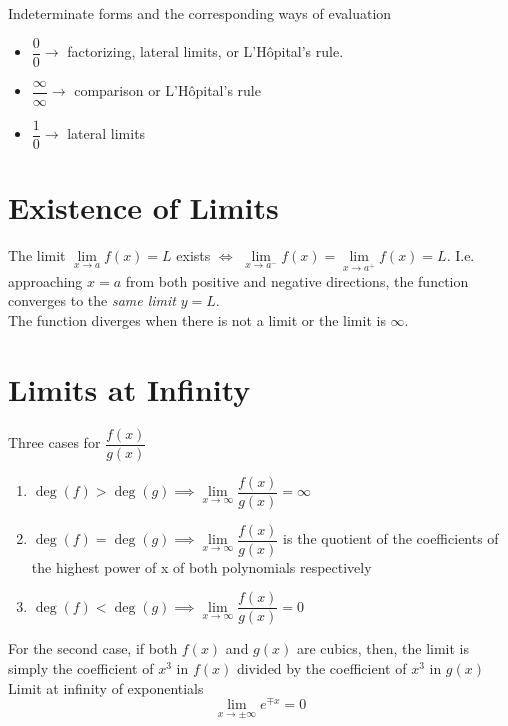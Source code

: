 \documentclass[11pt]{article}
\newcommand{\lb}{\\[8pt]}
\begin{document}
\bigskip
Indeterminate forms and the corresponding ways of evaluation
\begin{itemize}
  \item $\dfrac{0}{0} \longrightarrow$ factorizing, lateral limits, or L'Hôpital's rule.
  \item $\dfrac{\infty}{\infty} \longrightarrow$ comparison or L'Hôpital's rule
  \item $\dfrac{1}{0} \longrightarrow$ lateral limits
\end{itemize}

\section{Existence of Limits}
The limit $\lim\limits_{x\to a}{f(x)} = L$ exists $\iff$ $\lim\limits_{x\to a^-}{f(x)} = \lim\limits_{x\to a^+}{f(x)} = L$. I.e. approaching $x = a$ from both positive and negative directions, the function converges to the \textit{same limit} $y = L$.\lb
The function diverges when there is not a limit or the limit is $\infty$.

\pagebreak

\section{Limits at Infinity}

Three cases for $\dfrac{f(x)}{g(x)}$
\begin{enumerate}
  \item $\deg(f) >\deg(g) \implies \lim\limits_{x\to\infty}{\dfrac{f(x)}{g(x)}}= \infty$
  \item $\deg(f) =\deg(g) \implies \lim\limits_{x\to\infty}{\dfrac{f(x)}{g(x)}}$ is the quotient of the coefficients of the highest power of x of both polynomials respectively
  \item $\deg(f) <\deg(g) \implies \lim\limits_{x\to\infty}{\dfrac{f(x)}{g(x)}}= 0$
\end{enumerate}
For the second case, if both $f(x)$ and $g(x)$ are cubics, then, the limit is simply the coefficient of $x^3$ in $f(x)$ divided by the coefficient of $x^3$ in $g(x)$\lb
Limit at infinity of exponentials
$$\lim\limits_{x\to\pm\infty} e^{\mp x} = 0$$
\end{document}
